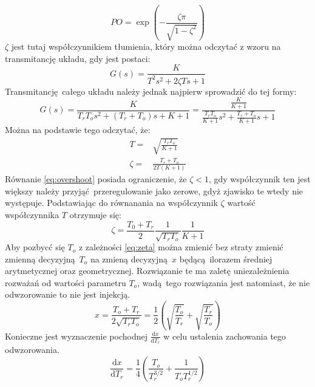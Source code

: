 \documentclass[a4paper, 12pt]{article}
\begin{document}
            \begin{equation}
                PO = \exp\left(
                    - \frac{\zeta \pi}{\sqrt{1 - \zeta^2}}
                \right)
                \label{eq:overshoot}
            \end{equation}
            $\zeta$ jest tutaj współczynnikiem tłumienia, który można odczytać z wzoru na transmitancję
            układu, gdy jest postaci:
            $$
                G(s) = \frac{K}{T^2s^2 + 2\zeta Ts + 1}
            $$
            Transmitancję całego układu należy jednak najpierw sprowadzić do tej formy:
            $$
                G(s) = \frac{K}{T_rT_os^2 + (T_r + T_o)s + K + 1} =
                    \frac{\frac{K}{K+1}}{\frac{T_rT_o}{K + 1}s^2 + \frac{T_r + T_o} {K + 1} s + 1}
            $$
            Można na podstawie tego odczytać, że:
            $$
                \begin{aligned}
                    T =& \sqrt{\frac{T_rT_o}{K + 1}} \\
                    \zeta =& \frac{T_r + T_o}{2 T (K + 1)}
                \end{aligned}
            $$
            Równanie \ref{eq:overshoot}  posiada ograniczenie, że $\zeta < 1$, gdy współczynnik 
            ten jest większy należy przyjąć przeregulowanie jako zerowe, gdyż zjawisko te wtedy 
            nie występuje. Podstawiając do równanania na współczynnik $\zeta$ wartość współczynnika
            $T$ otrzymuje się:
            \begin{equation}
                \zeta = \frac{T_0 + T_r}{2} \frac{1}{\sqrt{T_rT_o}} \frac{1}{K + 1}
                \label{eq:zeta}
            \end{equation}
            Aby pozbycć się $T_o$ z zależności \ref{eq:zeta} można zmienić bez straty zmienić zmienną
            decyzyjną $T_o$ na zmieną decyzyjną $x$ będącą ilorazem średniej arytmetycznej oraz 
            geometrycznej. Rozwiązanie te ma zaletę uniezależnienia rozważań od wartości parametru
            $T_o$, wadą tego rozwiązania jest natomiast, że nie odwzorowanie to nie jest injekcją.
            $$
                x = \frac{T_o + T_r}{2\sqrt{T_rT_o}} = \frac{1}{2} 
                \left(
                    \sqrt{\frac{T_o}{T_r}} + \sqrt{\frac{T_r}{T_o}}
                \right)
            $$
            Konieczne jest wyznaczenie pochodnej $\frac{\mathrm{d}x}{\mathrm{d}T_r}$ w celu ustalenia
            zachowania tego odwzorowania.
            $$
                \frac{\mathrm{d}x}{\mathrm{d}T_r} = \frac{1}{4} \left(
                    \frac{T_o}{T_r^{3/2}} +
                    \frac{1}{T_o T_r^{1/2}}
                \right)
            $$
\end{document}

